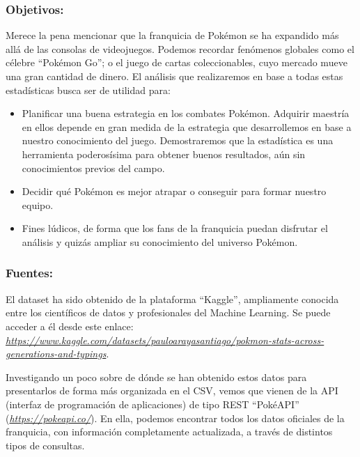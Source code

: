 \documentclass[
  12pt,
]{extreport}
\begin{document}
\subsubsection{Objetivos:}\label{objetivos}

Merece la pena mencionar que la franquicia de Pokémon se ha expandido
más allá de las consolas de videojuegos. Podemos recordar fenómenos
globales como el célebre ``Pokémon Go''; o el juego de cartas
coleccionables, cuyo mercado mueve una gran cantidad de dinero. El
análisis que realizaremos en base a todas estas estadísticas busca ser
de utilidad para:

\begin{itemize}
\item
  Planificar una buena estrategia en los combates Pokémon. Adquirir
  maestría en ellos depende en gran medida de la estrategia que
  desarrollemos en base a nuestro conocimiento del juego. Demostraremos
  que la estadística es una herramienta poderosísima para obtener buenos
  resultados, aún sin conocimientos previos del campo.
\item
  Decidir qué Pokémon es mejor atrapar o conseguir para formar nuestro
  equipo.
\item
  Fines lúdicos, de forma que los fans de la franquicia puedan disfrutar
  el análisis y quizás ampliar su conocimiento del universo Pokémon.
\end{itemize}

\subsubsection{Fuentes:}\label{fuentes}

El dataset ha sido obtenido de la plataforma ``Kaggle'', ampliamente
conocida entre los científicos de datos y profesionales del Machine
Learning. Se puede acceder a él desde este enlace:
\href{https://www.kaggle.com/datasets/pauloarayasantiago/pokmon-stats-across-generations-and-typings}{\emph{https://www.kaggle.com/datasets/pauloarayasantiago/pokmon-stats-across-generations-and-typings}}.

Investigando un poco sobre de dónde se han obtenido estos datos para
presentarlos de forma más organizada en el CSV, vemos que vienen de la
API (interfaz de programación de aplicaciones) de tipo REST ``PokéAPI''
(\href{https://pokeapi.co/}{\emph{https://pokeapi.co/}}). En ella,
podemos encontrar todos los datos oficiales de la franquicia, con
información completamente actualizada, a través de distintos tipos de
consultas.
\end{document}
